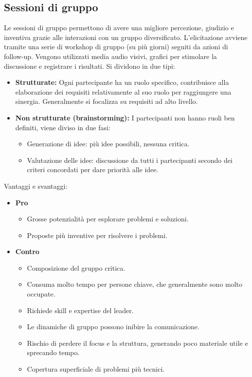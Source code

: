 \documentclass[../main.tex]{subfiles}
\begin{document}
\subsection{Sessioni di gruppo}
Le sessioni di gruppo permettono di avere una migliore percezione, giudizio e inventiva grazie alle interazioni con un gruppo diversificato.
L'elicitazione avviene tramite una serie di workshop di gruppo (su più giorni) seguiti da azioni di follow-up.
Vengono utilizzati media audio visivi, grafici per stimolare la discussione e registrare i risultati.
Si dividono in due tipi:
\begin{itemize}
	\item \textbf{Strutturate:} Ogni partecipante ha un ruolo specifico, contribuisce alla elaborazione dei requisiti relativamente al suo ruolo per raggiungere una sinergia.
	Generalmente si focalizza su requisiti ad alto livello.
	\item \textbf{Non strutturate (brainstorming):} I partecipanti non hanno ruoli ben definiti, viene diviso in due fasi:
	\begin{itemize}
		\item Generazione di idee: più idee possibili, nessuna critica.
		\item Valutazione delle idee: discussione da tutti i partecipanti secondo dei criteri concordati per dare priorità alle idee.
	\end{itemize}
\end{itemize}
Vantaggi e svantaggi:
\begin{itemize}
	\item \textbf{Pro}
	\begin{itemize}
		\item Grosse potenzialità per esplorare problemi e soluzioni.
		\item Proposte più inventive per risolvere i problemi.
	\end{itemize}
	\item \textbf{Contro}
	\begin{itemize}
		\item Composizione del gruppo critica.
		\item Consuma molto tempo per persone chiave, che generalmente sono molto occupate.
		\item Richiede skill e expertise del leader.
		\item Le dinamiche di gruppo possono inibire la comunicazione.
		\item Rischio di perdere il focus e la struttura, generando poco materiale utile e sprecando tempo.
		\item Copertura superficiale di problemi più tecnici.
	\end{itemize}
\end{itemize}
\end{document}
